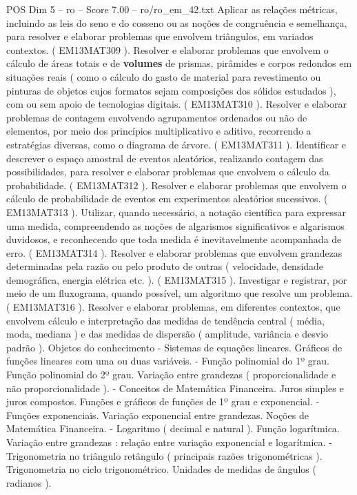 \begin{textsample}{POS Dim 5 – ro – Score 7.00 – ro/ro\_em\_42.txt}
Aplicar as relações métricas, incluindo as leis do seno e do cosseno ou as noções de congruência e semelhança, para resolver e elaborar problemas que envolvem triângulos, em variados contextos. ( EM13MAT309 ).
Resolver e elaborar problemas que envolvem o cálculo de áreas totais e de \textbf{volumes} de prismas, pirâmides e corpos redondos em situações reais ( como o cálculo do gasto de material para revestimento ou pinturas de objetos cujos formatos sejam composições dos sólidos estudados ), com ou sem apoio de tecnologias digitais. ( EM13MAT310 ).
Resolver e elaborar problemas de contagem envolvendo agrupamentos ordenados ou não de elementos, por meio dos princípios multiplicativo e aditivo, recorrendo a estratégias diversas, como o diagrama de árvore. ( EM13MAT311 ).
Identificar e descrever o espaço amostral de eventos aleatórios, realizando contagem das possibilidades, para resolver e elaborar problemas que envolvem o cálculo da probabilidade. ( EM13MAT312 ).
Resolver e elaborar problemas que envolvem o cálculo de probabilidade de eventos em experimentos aleatórios sucessivos. ( EM13MAT313 ).
Utilizar, quando necessário, a notação científica para expressar uma medida, compreendendo as noções de algarismos significativos e algarismos duvidosos, e reconhecendo que toda medida é inevitavelmente acompanhada de erro. ( EM13MAT314 ).
Resolver e elaborar problemas que envolvem grandezas determinadas pela razão ou pelo produto de outras ( velocidade, densidade demográfica, energia elétrica etc. ). ( EM13MAT315 ).
Investigar e registrar, por meio de um fluxograma, quando possível, um algoritmo que resolve um problema. ( EM13MAT316 ).
Resolver e elaborar problemas, em diferentes contextos, que envolvem cálculo e interpretação das medidas de tendência central ( média, moda, mediana ) e das medidas de dispersão ( amplitude, variância e desvio padrão ).
Objetos do conhecimento - Sistemas de equações lineares.
Gráficos de funções lineares com uma ou duas variáveis. - Função polinomial do 1º grau.
Função polinomial do 2º grau.
Variação entre grandezas ( proporcionalidade e não proporcionalidade ). - Conceitos de Matemática Financeira.
Juros simples e juros compostos.
Funções e gráficos de funções de 1º grau e exponencial. - Funções exponenciais.
Variação exponencial entre grandezas.
Noções de Matemática Financeira. - Logaritmo ( decimal e natural ).
Função logarítmica.
Variação entre grandezas : relação entre variação exponencial e logarítmica. - Trigonometria no triângulo retângulo ( principais razões trigonométricas ).
Trigonometria no ciclo trigonométrico.
Unidades de medidas de ângulos ( radianos ).

\end{textsample}
